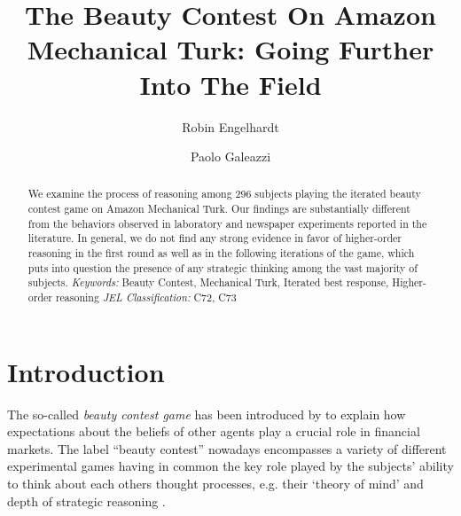 \documentclass[12pt,review]{elsarticle}
\providecommand{\keywords}[1]{\textit{Keywords:} #1}
\providecommand{\JEL}[1]{\textit{JEL Classification:} #1}
\begin{document}
%


\begin{frontmatter}
\title{The Beauty Contest On Amazon Mechanical Turk: Going Further Into The Field}

\author{Robin Engelhardt}
\author{Paolo Galeazzi}
\address{Center for Information and Bubble Studies, University of Copenhagen, Karen Blixens Plads 8, 2300 Copenhagen, Denmark}


\begin{abstract}
We examine the process of reasoning among 296 subjects playing the
iterated beauty contest game on Amazon Mechanical Turk. Our findings
are substantially different from the behaviors observed in laboratory
and newspaper experiments reported in the literature. In general,
we do not find any strong evidence in favor of higher-order reasoning
in the first round as well as in the following iterations of the game,
which puts into question the presence of any strategic thinking among
the vast majority of subjects.
\newline
\keywords{Beauty Contest,  Mechanical Turk,  Iterated best response,  Higher-order reasoning}
\newline
\JEL{C72, C73}
\end{abstract}


\end{frontmatter}

\linenumbers

\section{Introduction\label{sec:Introduction}}
\noindent
The so-called \emph{beauty contest game} has been introduced by \citet{Keynes:1936}
to explain how expectations about the beliefs of other agents play
a crucial role in financial markets. The label \textquotedblleft beauty
contest\textquotedblright{} nowadays encompasses a variety of different
experimental games having in common the key role played by the subjects' ability to think about each others thought processes, e.g. their `theory of mind' and depth of strategic reasoning  \citep{Nagel95,NagelEtAl02,NagelGrosskopf2008,HoCamererWeigelt98,CamererHoChong2004,Rapoport06,DuffyNagel97}.
\end{document}
